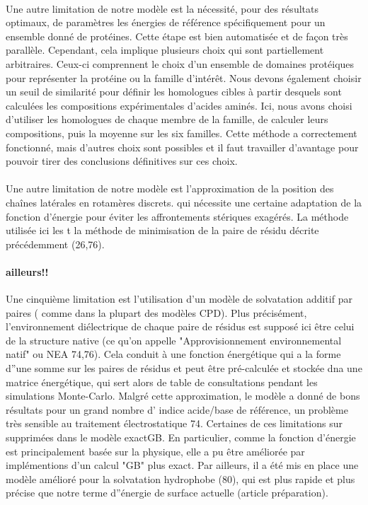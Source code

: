 \begin{enumarete}
\begin{enumerate}
\paragraph{}
Une autre limitation de notre modèle est la nécessité, pour des résultats optimaux, de paramètres les énergies de référence spécifiquement pour un ensemble donné de protéines. Cette étape est bien automatisée et de façon très parallèle. Cependant, cela implique plusieurs choix qui sont partiellement arbitraires. Ceux-ci comprennent le choix d'un ensemble de domaines protéiques pour représenter la protéine ou la famille d'intérêt. Nous devons également choisir un seuil de similarité pour définir les homologues cibles à partir desquels sont calculées les compositions expérimentales d'acides aminés. Ici, nous avons choisi d'utiliser les homologues de chaque membre de la famille, de calculer leurs compositions, puis la moyenne sur les six familles. Cette méthode a correctement fonctionné, mais d'autres choix sont possibles et il faut travailler d'avantage pour pouvoir tirer des conclusions définitives sur ces choix.
\paragraph{}
Une autre limitation de notre modèle est l'approximation de  la position des chaînes latérales en rotamères discrets. qui nécessite une certaine adaptation de la fonction d'énergie pour éviter les affrontements stériques exagérés. La méthode utilisée ici les t la méthode de minimisation de la paire de résidu décrite précédemment (26,76).
\paragraph{ailleurs!!}
Une cinquième limitation est l'utilisation d'un modèle de solvatation additif par paires ( comme dans la plupart des modèles CPD). Plus précisément, l'environnement diélectrique de chaque paire de résidus est supposé ici être celui de la structure native (ce qu'on appelle "Approvisionnement environnemental natif" ou NEA 74,76). Cela conduit à une fonction énergétique qui a la forme d''une somme sur les paires de résidus et peut être pré-calculée et stockée dna une matrice énergétique, qui sert alors de table de consultations pendant les simulations Monte-Carlo. Malgré cette approximation, le modèle a donné de bons résultats pour un grand nombre d' indice acide/base de référence, un problème très sensible au traitement électrostatique 74. Certaines de ces limitations sur supprimées dans le modèle exactGB. En particulier, comme la fonction d'énergie est principalement basée sur la physique, elle a pu être améliorée par implémentions d'un calcul "GB" plus exact. Par ailleurs, il a été mis en place une modèle amélioré pour la solvatation hydrophobe (80), qui est plus rapide et plus précise que notre terme d''énergie de surface actuelle (article préparation).


\end{enumerate}
\end{enumarete}
